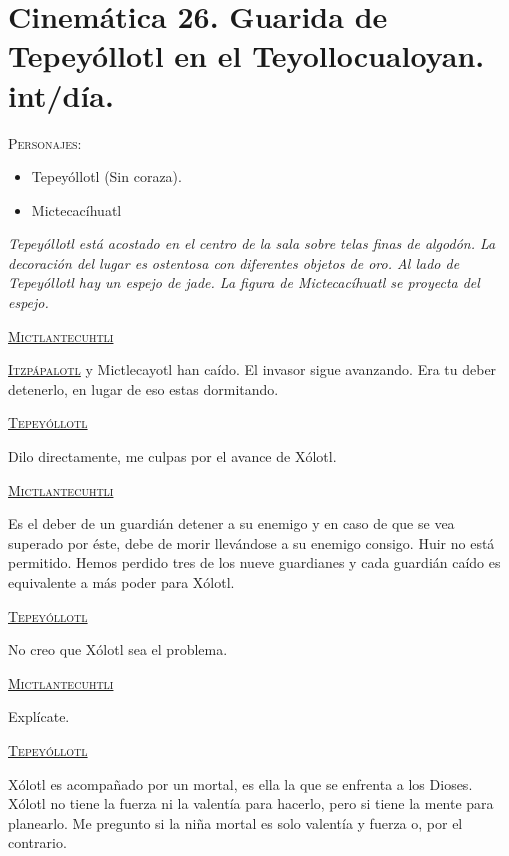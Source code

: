 \documentclass[11pt,letterpaper]{article}
\begin{document}
\section{Cinemática 26. Guarida de Tepeyóllotl en el Teyollocualoyan. int/día.}
 \textsc{Personajes}:
 \begin{itemize}
 \item Tepeyóllotl (Sin coraza).
\item Mictecacíhuatl
 \end{itemize}
\textit{Tepeyóllotl está acostado en el centro de la sala sobre telas finas de algodón. La decoración del lugar es ostentosa con diferentes objetos de oro. Al lado de Tepeyóllotl hay un espejo de jade. La figura de   Mictecacíhuatl se proyecta del espejo.}
\begin{center}
\textsc{\underline{Mictlantecuhtli}}
\\
\par
\textsc{\underline{Itzpápalotl}} y Mictlecayotl han caído. El invasor sigue avanzando. Era tu deber detenerlo, en lugar de eso estas dormitando.
\\
\par
\textsc{\underline{Tepeyóllotl}}
\\
\par
Dilo directamente, me culpas por el avance de Xólotl.
\\
\par
\textsc{\underline{Mictlantecuhtli}}
\\
\par
Es el deber de un guardián detener a su enemigo y en caso de que se vea superado por éste, debe de morir llevándose a su enemigo consigo. Huir no está permitido. Hemos perdido tres de los nueve guardianes y cada guardián caído es equivalente a más poder para Xólotl.
\\
\par
\textsc{\underline{Tepeyóllotl}}
\\
\par
No creo que Xólotl sea el problema.
\\
\par
\textsc{\underline{Mictlantecuhtli}}
\\
\par
Explícate.
\\
\par
\textsc{\underline{Tepeyóllotl}}
\\
\par
Xólotl es acompañado por un mortal, es ella la que se enfrenta a los Dioses. Xólotl no tiene la fuerza ni la valentía para hacerlo, pero si tiene la mente para planearlo. Me pregunto si la niña mortal es solo valentía y fuerza o, por el contrario.

\end{center}
\end{document}
